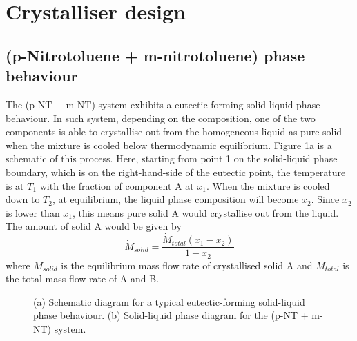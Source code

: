 \section{Crystalliser design}

\subsection{(p-Nitrotoluene + m-nitrotoluene) phase behaviour}

The (p-NT + m-NT) system exhibits a eutectic-forming solid-liquid phase behaviour. In such system, depending on the composition, one of the two components is able to crystallise out from the homogeneous liquid as pure solid when the mixture is cooled below thermodynamic equilibrium. \cite{seader_separation_2011} Figure \ref{fig:eutectic schematic}a is a schematic of this process. Here, starting from point 1 on the solid-liquid phase boundary, which is on the right-hand-side of the eutectic point, the temperature is at $T_1$ with the fraction of component A at $x_1$. When the mixture is cooled down to $T_2$, at equilibrium, the liquid phase composition will become $x_2$. Since $x_2$ is lower than $x_1$, this means pure solid A would crystallise out from the liquid. The amount of solid A would be given by
\begin{equation}\label{eq:amount solid A equilibrium}
    \dot{M}_{solid} = \frac{\dot{M}_{total} (x_1 - x_2)}{1 - x_2}
\end{equation}
where $\dot{M}_{solid}$ is the equilibrium mass flow rate of crystallised solid A and $\dot{M}_{total}$ is the total mass flow rate of A and B. 

\begin{figure}[h]
    \centering
    
    \caption{(a) Schematic diagram for a typical eutectic-forming solid-liquid phase behaviour. (b) Solid-liquid phase diagram for the (p-NT + m-NT) system.}
    \label{fig:eutectic schematic}
\end{figure}

